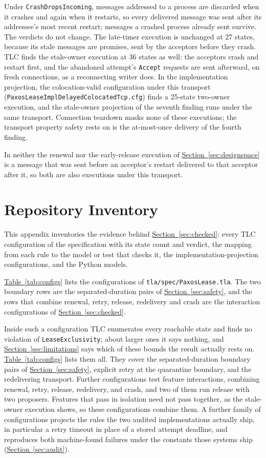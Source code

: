 \documentclass[final,5p,times,twocolumn,number]{elsarticle}
\newcommand{\code}[1]{\texttt{#1}}
\newcommand{\secref}[1]{\hyperref[#1]{Section~\ref*{#1}}}
\newcommand{\tabref}[1]{\hyperref[#1]{Table~\ref*{#1}}}
\begin{document}
Under \code{CrashDropsIncoming}, messages addressed to a process are discarded when it crashes and again when it restarts, so every delivered message was sent after its addressee's most recent restart; messages a crashed process already sent survive.  The verdicts do not change.  The late-timer execution is unchanged at 27 states, because its stale messages are promises, sent by the acceptors before they crash.  TLC finds the stale-owner execution at 36 states as well: the acceptors crash and restart first, and the abandoned attempt's \code{Accept} requests are sent afterward, on fresh connections, as a reconnecting writer does.  In the implementation projection, the colocation-valid configuration under this transport (\code{PaxosLeaseImplDelayedColocatedTcp.cfg}) finds a 25-state two-owner execution, and the stale-owner projection of the seventh finding runs under the same transport.  Connection teardown masks none of these executions; the transport property safety rests on is the at-most-once delivery of the fourth finding.

In neither the renewal nor the early-release execution of \secref{sec:designspace} is a message that was sent before an acceptor's restart delivered to that acceptor after it, so both are also executions under this transport.

\section{Repository Inventory}\label{app:artifact}

This appendix inventories the evidence behind \secref{sec:checked}: every TLC configuration of the specification with its state count and verdict, the mapping from each rule to the model or test that checks it, the implementation-projection configurations, and the Python models.

\tabref{tab:configs} lists the configurations of \code{tla/spec/PaxosLease.tla}.  The two boundary rows are the separated-duration pairs of \secref{sec:safety}, and the rows that combine renewal, retry, release, redelivery and crash are the interaction configurations of \secref{sec:checked}.

Inside such a configuration TLC enumerates every reachable state and finds no violation of \code{LeaseExclusivity}; about larger ones it says nothing, and \secref{sec:limitations} says which of these bounds the result actually rests on.  \tabref{tab:configs} lists them all.  They cover the separated-duration boundary pairs of \secref{sec:safety}, explicit retry at the quarantine boundary, and the redelivering transport.  Further configurations test feature interactions, combining renewal, retry, release, redelivery, and crash, and two of them run release with two proposers.  Features that pass in isolation need not pass together, as the stale-owner execution shows, so these configurations combine them.  A further family of configurations projects the rules the two audited implementations actually ship, in particular a retry timeout in place of a stored attempt deadline, and reproduces both machine-found failures under the constants those systems ship (\secref{sec:audit}).
\end{document}
